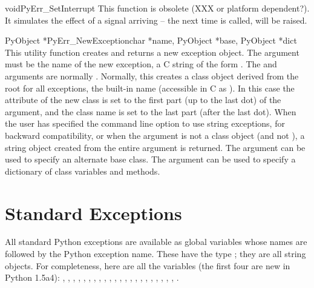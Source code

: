 \begin{cfuncdesc}{void}{PyErr_SetInterrupt}{}
This function is obsolete (XXX or platform dependent?).  It simulates
the effect of a  signal arriving -- the next time
 is called,  will be
raised.
\end{cfuncdesc}

\begin{cfuncdesc}{PyObject *}{PyErr_NewException}{char *name,
PyObject *base, PyObject *dict}
This utility function creates and returns a new exception object.  The
 argument must be the name of the new exception, a C string
of the form .  The  and 
arguments are normally \NULL{}.  Normally, this creates a class
object derived from the root for all exceptions, the built-in name
 (accessible in C as ).  In this
case the  attribute of the new class is set to the
first part (up to the last dot) of the  argument, and the
class name is set to the last part (after the last dot).  When the
user has specified the  command line option to use string
exceptions, for backward compatibility, or when the 
argument is not a class object (and not \NULL{}), a string object
created from the entire  argument is returned.  The
 argument can be used to specify an alternate base class.
The  argument can be used to specify a dictionary of class
variables and methods.
\end{cfuncdesc}


\section{Standard Exceptions}

All standard Python exceptions are available as global variables whose
names are  followed by the Python exception name.
These have the type ; they are all string objects.
For completeness, here are all the variables (the first four are new
in Python 1.5a4):
,
,
,
,
,
,
,
,
,
,
,
,
,
,
,
,
,
,
,
,
,
,
.


